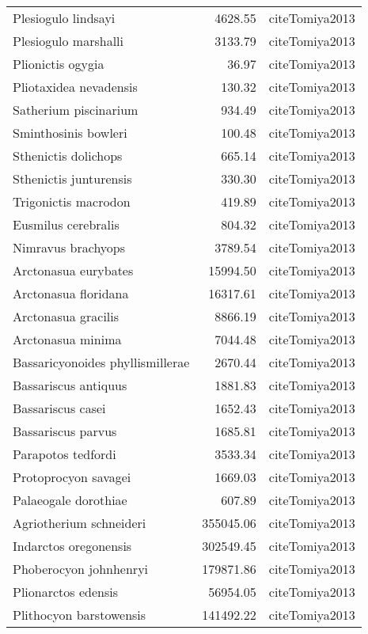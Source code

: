 \begin{table}[ht]
\begin{tabular}{lrl}
  Plesiogulo lindsayi & 4628.55 & cite{Tomiya2013} \\ 
  Plesiogulo marshalli & 3133.79 & cite{Tomiya2013} \\ 
  Plionictis ogygia & 36.97 & cite{Tomiya2013} \\ 
  Pliotaxidea nevadensis & 130.32 & cite{Tomiya2013} \\ 
  Satherium piscinarium & 934.49 & cite{Tomiya2013} \\ 
  Sminthosinis bowleri & 100.48 & cite{Tomiya2013} \\ 
  Sthenictis dolichops & 665.14 & cite{Tomiya2013} \\ 
  Sthenictis junturensis & 330.30 & cite{Tomiya2013} \\ 
  Trigonictis macrodon & 419.89 & cite{Tomiya2013} \\ 
  Eusmilus cerebralis & 804.32 & cite{Tomiya2013} \\ 
  Nimravus brachyops & 3789.54 & cite{Tomiya2013} \\ 
  Arctonasua eurybates & 15994.50 & cite{Tomiya2013} \\ 
  Arctonasua floridana & 16317.61 & cite{Tomiya2013} \\ 
  Arctonasua gracilis & 8866.19 & cite{Tomiya2013} \\ 
  Arctonasua minima & 7044.48 & cite{Tomiya2013} \\ 
  Bassaricyonoides phyllismillerae & 2670.44 & cite{Tomiya2013} \\ 
  Bassariscus antiquus & 1881.83 & cite{Tomiya2013} \\ 
  Bassariscus casei & 1652.43 & cite{Tomiya2013} \\ 
  Bassariscus parvus & 1685.81 & cite{Tomiya2013} \\ 
  Parapotos tedfordi & 3533.34 & cite{Tomiya2013} \\ 
  Protoprocyon savagei & 1669.03 & cite{Tomiya2013} \\ 
  Palaeogale dorothiae & 607.89 & cite{Tomiya2013} \\ 
  Agriotherium schneideri & 355045.06 & cite{Tomiya2013} \\ 
  Indarctos oregonensis & 302549.45 & cite{Tomiya2013} \\ 
  Phoberocyon johnhenryi & 179871.86 & cite{Tomiya2013} \\ 
  Plionarctos edensis & 56954.05 & cite{Tomiya2013} \\ 
  Plithocyon barstowensis & 141492.22 & cite{Tomiya2013} \\ 

\end{tabular}
\end{table}
